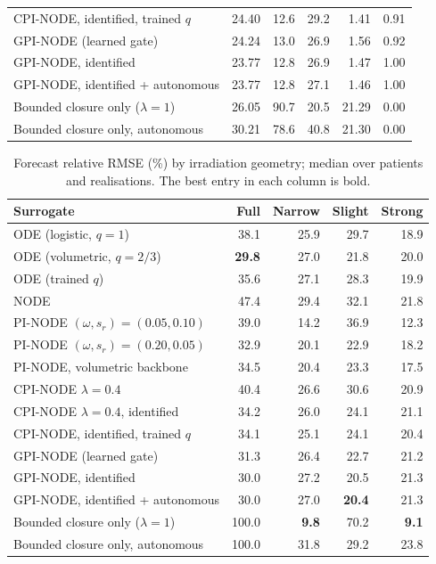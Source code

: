 \begin{table}[H]
\begin{tabular}{lrrrrr}
CPI-NODE, identified, trained $q$ & 24.40 & 12.6 & 29.2 & 1.41 & 0.91 \\
GPI-NODE (learned gate) & 24.24 & 13.0 & 26.9 & 1.56 & 0.92 \\
GPI-NODE, identified & 23.77 & 12.8 & 26.9 & 1.47 & 1.00 \\
GPI-NODE, identified + autonomous & 23.77 & 12.8 & 27.1 & 1.46 & 1.00 \\
Bounded closure only ($\lambda{=}1$) & 26.05 & 90.7 & 20.5 & 21.29 & 0.00 \\
Bounded closure only, autonomous & 30.21 & 78.6 & 40.8 & 21.30 & 0.00 \\
\hline
\end{tabular}

\end{table}

\begin{table}[H]
\caption{Forecast relative RMSE (\%) by irradiation geometry; median over
patients and realisations. The best entry in each column is bold.}
\label{tab:per_case}
\centering\scriptsize
\setlength{\tabcolsep}{5pt}
%
\begin{tabular}{lrrrr}
\hline
\textbf{Surrogate} & \textbf{Full} & \textbf{Narrow} & \textbf{Slight} & \textbf{Strong} \\
\hline
ODE (logistic, $q{=}1$) & 38.1 & 25.9 & 29.7 & 18.9 \\
ODE (volumetric, $q{=}2/3$) & \textbf{29.8} & 27.0 & 21.8 & 20.0 \\
ODE (trained $q$) & 35.6 & 27.1 & 28.3 & 19.9 \\
NODE & 47.4 & 29.4 & 32.1 & 21.8 \\
PI-NODE $(\omega,s_r){=}(0.05,0.10)$ & 39.0 & 14.2 & 36.9 & 12.3 \\
PI-NODE $(\omega,s_r){=}(0.20,0.05)$ & 32.9 & 20.1 & 22.9 & 18.2 \\
PI-NODE, volumetric backbone & 34.5 & 20.4 & 23.3 & 17.5 \\
CPI-NODE $\lambda{=}0.4$ & 40.4 & 26.6 & 30.6 & 20.9 \\
CPI-NODE $\lambda{=}0.4$, identified & 34.2 & 26.0 & 24.1 & 21.1 \\
CPI-NODE, identified, trained $q$ & 34.1 & 25.1 & 24.1 & 20.4 \\
GPI-NODE (learned gate) & 31.3 & 26.4 & 22.7 & 21.2 \\
GPI-NODE, identified & 30.0 & 27.2 & 20.5 & 21.3 \\
GPI-NODE, identified + autonomous & 30.0 & 27.0 & \textbf{20.4} & 21.3 \\
Bounded closure only ($\lambda{=}1$) & 100.0 & \textbf{9.8} & 70.2 & \textbf{9.1} \\
Bounded closure only, autonomous & 100.0 & 31.8 & 29.2 & 23.8 \\
\hline
\end{tabular}

\end{table}

